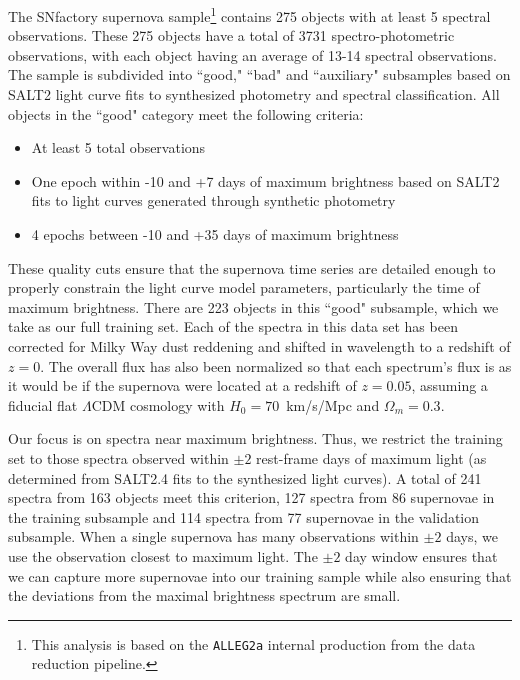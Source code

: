 The SNfactory supernova sample\footnote{This analysis is based on the \texttt{ALLEG2a} internal production from the data reduction pipeline.} contains 275 objects with at least 5 spectral observations. These 275 objects have a total of 3731 spectro-photometric observations, with each object having an average of 13-14 spectral observations. The sample is subdivided into ``good," ``bad" and ``auxiliary" subsamples based on SALT2 light curve fits to synthesized photometry and spectral classification. All objects in the ``good" category meet the following criteria:
\begin{itemize}
    \item At least 5 total observations
    \item One epoch within -10 and +7 days of maximum brightness based on SALT2 fits to light curves generated through synthetic photometry
    \item 4 epochs between -10 and +35 days of maximum brightness 
\end{itemize}
These quality cuts ensure that the supernova time series are detailed enough to properly constrain the light curve model parameters, particularly the time of maximum brightness. There are 223 objects in this ``good" subsample, which we take as our full training set. Each of the spectra in this data set has been corrected for Milky Way dust reddening and shifted in wavelength to a redshift of $z=0$. The overall flux has also been normalized so that each spectrum's flux is as it would be if the supernova were located at a redshift of $z=0.05$, assuming a fiducial flat $\Lambda$CDM cosmology with $H_0=70$~km/s/Mpc and $\Omega_m = 0.3$.

Our focus is on spectra near maximum brightness. Thus, we restrict the training set to those spectra observed within $\pm 2$ rest-frame days of maximum light (as determined from SALT2.4 fits to the synthesized light curves). A total of 241 spectra from 163 objects meet this criterion, 127 spectra from 86 supernovae in the training subsample and 114 spectra from 77 supernovae in the validation subsample. When a single supernova has many observations within $\pm 2$ days, we use the observation closest to maximum light. The $\pm 2$ day window ensures that we can capture more supernovae into our training sample while also ensuring that the deviations from the maximal brightness spectrum are small.

